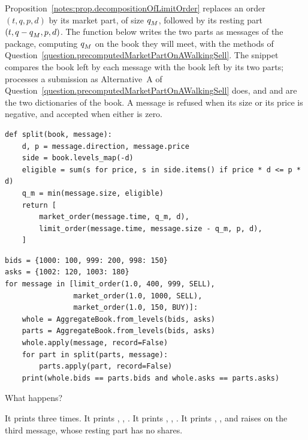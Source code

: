 \begin{question}
\label{question.splittingAMarketOrderLosesItsRemainder}
Proposition~\ref{notes:prop.decompositionOfLimitOrder} replaces an order $(t,q,p,d)$
by its market part, of size $q_{M}^{}$,
followed by its resting part $(t,q-q_{M}^{},p,d)$.
The function  below writes the two parts as messages of the package,
computing $q_{M}^{}$ on the book they will meet,
with the methods of Question~\ref{question.precomputedMarketPartOnAWalkingSell}.
The snippet compares the book left by each message with the book left by its two parts;
 processes a submission as Alternative~A of
Question~\ref{question.precomputedMarketPartOnAWalkingSell} does,
and  and  are the two dictionaries of the book.
A message is refused when its size or its price is negative,
and accepted when either is zero.
\begin{lstlisting}[caption={An order as its two parts}, label=listing.splittingAMarketOrderSplit]
def split(book, message):
    d, p = message.direction, message.price
    side = book.levels_map(-d)
    eligible = sum(s for price, s in side.items() if price * d <= p * d)
    q_m = min(message.size, eligible)
    return [
        market_order(message.time, q_m, d),
        limit_order(message.time, message.size - q_m, p, d),
    ]
\end{lstlisting}
\begin{lstlisting}[caption={Each of three messages against its two parts}, label=listing.splittingAMarketOrderRun]
bids = {1000: 100, 999: 200, 998: 150}
asks = {1002: 120, 1003: 180}
for message in [limit_order(1.0, 400, 999, SELL),
                market_order(1.0, 1000, SELL),
                market_order(1.0, 150, BUY)]:
    whole = AggregateBook.from_levels(bids, asks)
    parts = AggregateBook.from_levels(bids, asks)
    whole.apply(message, record=False)
    for part in split(parts, message):
        parts.apply(part, record=False)
    print(whole.bids == parts.bids and whole.asks == parts.asks)
\end{lstlisting}
What happens?
\begin{choices}
 \choice It prints  three times.
 \correctchoice It prints , , .
 \choice It prints , , .
 \choice It prints , ,
  and raises  on the third message, whose resting part has no shares.
\end{choices}
\end{question}

